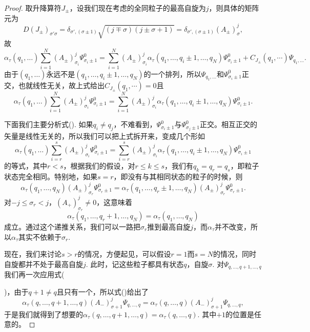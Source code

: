 \documentclass[11pt]{article}
\theoremstyle{definition}
\theoremstyle{plain}
\begin{document}
\begin{proof}
取升降算符$J_\pm$，设我们现在考虑的全同粒子的最高自旋为$j$，则具体的矩阵元为
\[
	D(J_\pm)_{\sigma'\sigma}=\delta_{\sigma',(\sigma\pm 1)}\sqrt{(j\mp\sigma)(j\pm\sigma+1)}=\delta_{\sigma',(\sigma\pm 1)}(A_\pm)^j_\sigma,
\]
故
\[
\alpha_\tau(q_1,\dots)\sum_{i=1}^N (A_\pm)^j_{\sigma_i}\Psi_{\sigma_i\pm 1}^0=\sum_{i=1}^N (A_\pm)^j_{\sigma_i}\alpha_\tau(q_1,\dots,q_i\pm 1,\dots,q_N)\Psi_{\sigma_i\pm 1}^0+C_{J_\pm}(q_1,\cdots) \Psi_{ q_1,\dots}.
\]
由于$( q_1,\dots)$永远不是$( q_1,\dots, q_i\pm 1,\dots, q_N)$的一个排列，所以$\Psi_{ q_1,\dots}$和$\Psi_{\sigma_i\pm 1}^0$正交，也就线性无关，故上式给出$C_{J_\pm}(q_1,\cdots)=0$且
\begin{equation}
\alpha_\tau(q_1,\dots)\sum_{i=1}^N (A_\pm)^j_{\sigma_i}\Psi_{\sigma_i\pm 1}^0=\sum_{i=1}^N (A_\pm)^j_{\sigma_i}\alpha_\tau(q_1,\dots,q_i\pm 1,\dots,q_N)\Psi_{\sigma_i\pm 1}^0.
\end{equation}

下面我们主要分析式(\theequation). 如果$q_i\neq q_j$，不难看到，$\Psi_{\sigma_i\pm 1}^0$与$\Psi_{\sigma_j\pm 1}^0$正交。相互正交的矢量是线性无关的，所以我们可以把上式拆开来，变成几个形如
\[
	\alpha_\tau(q_1,\dots)\sum_{i=r}^s (A_\pm)^j_{\sigma_i}\Psi_{\sigma_i\pm 1}^0=\sum_{i=r}^s (A_\pm)^j_{\sigma_i}\alpha_\tau(q_1,\dots,q_i\pm 1,\dots,q_N)\Psi_{\sigma_i\pm 1}^0
\]
的等式，其中$r<s$，根据我们的假设，对$r\leq k \leq s$，我们有$q_k=q_r=q_s$，即粒子状态完全相同。特别地，如果$s=r$，即没有与其相同状态的粒子的时候，则
\begin{equation}
\alpha_\tau(q_1,\dots,q_N)(A_\pm)^j_{\sigma_r}\Psi_{\sigma_r\pm 1}^0=\alpha_\tau(q_1,\dots,q_r\pm 1,\dots,q_N)(A_\pm)^j_{\sigma_r}\Psi_{\sigma_r\pm 1}^0.
\end{equation}
对$-j \leq \sigma_r< j$，$(A_+)^{j}_{\sigma_r}\neq 0$，这意味着
\[
	\alpha_\tau(q_1,\dots,q_r+1,\dots,q_N)=\alpha_\tau(q_1,\dots,q_N)
\]
成立。通过这个递推关系，我们可以一路把$\sigma_r$推到最高自旋$j$，而$\alpha_\tau$并不改变，所以$\alpha_\tau$其实不依赖于$\sigma_r$.

现在，我们来讨论$s>r$的情况，方便起见，可以假设$r=1$而$s=N$的情况，同时自旋都并不处于最高自旋$j$. 此时，记这些粒子都具有状态$q$，自旋$\sigma$. 对$\Psi_{q,\dots,q+1,\dots,q}$我们再一次应用式({\addtocounter{equation}{-1}\theequation}\addtocounter{equation}{1})，由于$q+1\neq q$且只有一个，所以式(\theequation)给出了
\[
	\alpha_\tau(q,\dots,q+ 1,\dots,q)(A_-)^j_{\sigma+1}\Psi_{q,\dots,q}=\alpha_\tau(q,\dots,q)(A_-)^j_{\sigma+1}\Psi_{q,\dots,q},
\]
于是我们就得到了想要的$\alpha_\tau(q,\dots,q + 1,\dots,q)=\alpha_\tau(q,\dots,q)$. 其中$+1$的位置是任意的。


\end{proof}
\end{document}
